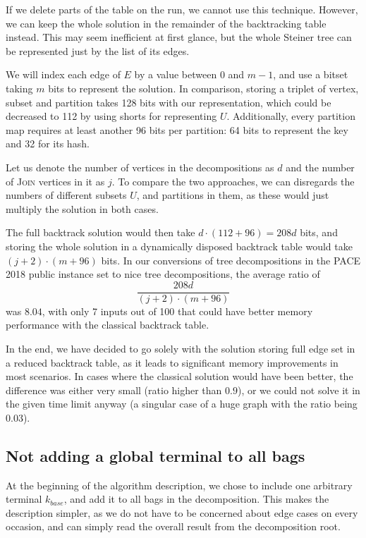 \documentclass[thesis=M,english,hidelinks]{FITthesis}[2012/10/20]
\theoremstyle{definition}
\begin{document}
If we delete parts of the table on the run, we cannot use this technique. However, we can keep the whole solution in
the remainder of the backtracking table instead. This may seem inefficient at first glance, but the whole Steiner tree
can be represented just by the list of its edges.

We will index each edge of $E$ by a value between $0$ and $m-1$, and use a bitset taking $m$ bits to represent the
solution. In comparison, storing a triplet of vertex, subset and partition takes 128 bits with our representation, which
could be decreased to 112 by using shorts for representing $U$. Additionally, every partition map requires at least
another 96 bits per partition: 64 bits to represent the key and 32 for its hash.

Let us denote the number of vertices in the decompositions as $d$ and the number of \textsc{Join} vertices in it as $j$.
To compare the two approaches, we can disregards the numbers of different subsets $U$, and partitions in them, as these
would just multiply the solution in both cases.

The full backtrack solution would then take $d \cdot (112 + 96) = 208d$ bits, and storing the whole solution in a
dynamically disposed backtrack table would take $(j + 2) \cdot (m + 96)$ bits. In our conversions of tree decompositions
in the PACE 2018 public instance set to nice tree decompositions, the average ratio of 
$$
\frac{208d}{(j+2)\cdot(m+96)}
$$
was $8.04$, with only 7 inputs out of 100 that could have better memory performance with the classical backtrack table.

In the end, we have decided to go solely with the solution storing full edge set in a reduced backtrack table, as it
leads to significant memory improvements in most scenarios. In cases where the classical solution would have been better,
the difference was either very small (ratio higher than $0.9$), or we could not solve it in the given time limit anyway
(a singular case of a huge graph with the ratio being $0.03$).

\subsection{Not adding a global terminal to all bags}
\label{sec:noglob}

At the beginning of the algorithm description, we chose to include one arbitrary terminal $k_{base}$, and add it to all
bags in the decomposition. This makes the description simpler, as we do not have to be concerned about edge cases on
every occasion, and can simply read the overall result from the decomposition root.
\end{document}
